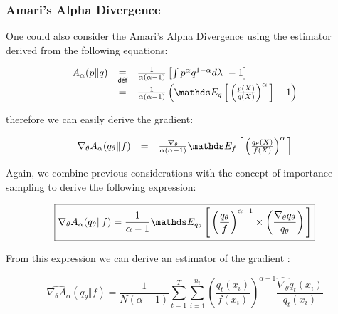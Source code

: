 \subsubsection{Amari's Alpha Divergence}

One could also consider the Amari's Alpha Divergence using the estimator derived from the following equations:

$$
	\begin{array}{lcl}
		A_\alpha( p \Vert q ) & \isdef & \frac{1}{\alpha( \alpha - 1 )} \left[ \int p^\alpha q^{1 - \alpha} d\lambda \ -1 \right]
		\\
		                      & = & \frac{1}{\alpha( \alpha - 1 )} \left( \esperanceloi q { \left( \frac {p(X)} {q(X)} \right)^\alpha } - 1\right)
	\end{array}
$$

therefore we can easily derive the gradient:

$$
	\begin{array}{lcl}
		\nabla_\theta A_\alpha( q_\theta \Vert f ) & = & \frac{\nabla_\theta}{\alpha( \alpha - 1 )}\esperanceloi f { \left( \frac {q_\theta(X)} {f(X)} \right)^\alpha }
	\end{array}
$$

\columnbreak

Again, we combine previous considerations with the concept of importance sampling to derive the following expression:

$$\boxed{\nabla_\theta A_\alpha( q_\theta \Vert f ) = \frac 1 {\alpha - 1} \esperanceloi{q_\theta}{ \left( \frac{q_\theta}{f} \right)^{\alpha - 1} \times \left( \frac{\nabla_\theta q_\theta}{q_\theta} \right) }}$$


From this expression we can derive an estimator of the gradient :

$$
\widehat{\nabla_\theta A_\alpha}( q_\theta \Vert f ) = 
\displaystyle\frac 1 {N(\alpha - 1)}
\sum\limits_{t=1}^T
\sum\limits_{i = 1}^{n_t}
\left( \frac{q_t(x_i)}{f(x_i)} \right)^{\alpha - 1}
\frac{\widehat{\nabla_\theta} q_t (x_i) }{ q_t(x_i) }
$$

